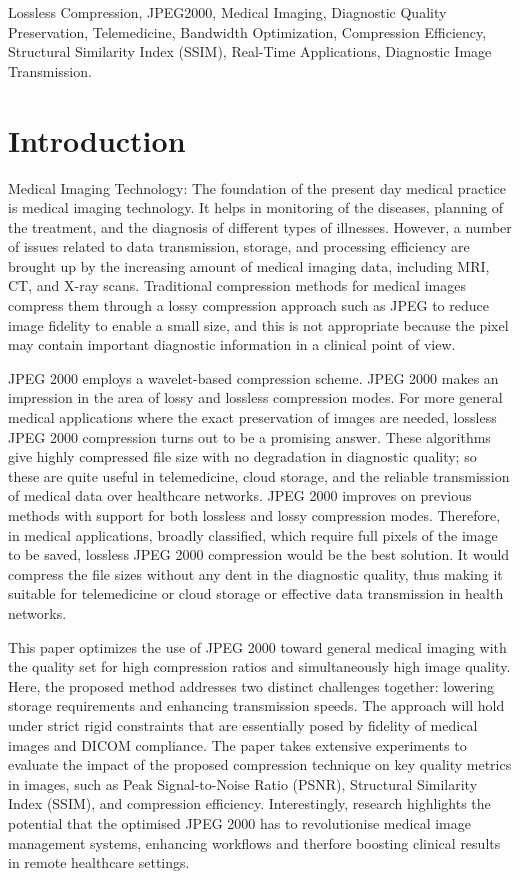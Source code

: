 \documentclass[conference,letterpaper]{IEEEtran}
\begin{document}
\begin{IEEEkeywords}
Lossless Compression, JPEG2000, Medical Imaging, Diagnostic Quality Preservation, Telemedicine, Bandwidth Optimization, Compression Efficiency, Structural Similarity Index (SSIM), Real-Time Applications, Diagnostic Image Transmission.
\end{IEEEkeywords}

\section{Introduction}
Medical Imaging Technology: The foundation of the present day medical practice is medical imaging technology.  It helps in monitoring of the diseases, planning of the treatment, and the diagnosis of different types of illnesses. However, a number of issues related to data transmission, storage, and processing efficiency are brought up by the increasing amount of medical imaging data, including MRI, CT, and X-ray scans. Traditional compression methods for medical images compress them through a lossy compression approach such as JPEG to reduce image fidelity to enable a small size, and this is not appropriate because the pixel may contain important diagnostic information in a clinical point of view.

JPEG 2000 employs a wavelet-based compression scheme. JPEG 2000 makes an impression in the area of lossy and lossless compression modes. For more general medical applications where the exact preservation of images are needed, lossless JPEG 2000 compression turns out to be a promising answer. These algorithms give highly compressed file size with no degradation in diagnostic quality; so these are quite useful in telemedicine, cloud storage, and the reliable transmission of medical data over healthcare networks. JPEG 2000 improves on previous methods with support for both lossless and lossy compression modes. Therefore, in medical applications, broadly classified, which require full pixels of the image to be saved, lossless JPEG 2000 compression would be the best solution. It would compress the file sizes without any dent in the diagnostic quality, thus making it suitable for telemedicine or cloud storage or effective data transmission in health networks.

This paper optimizes the use of JPEG 2000 toward general medical imaging with the quality set for high compression ratios and simultaneously high image quality. Here, the proposed method addresses two distinct challenges together: lowering storage requirements and enhancing transmission speeds. The approach will hold under strict rigid constraints that are essentially posed by fidelity of medical images and DICOM compliance. The paper takes extensive experiments to evaluate the impact of the proposed compression technique on key quality metrics in images, such as Peak Signal-to-Noise Ratio (PSNR), Structural Similarity Index (SSIM), and compression efficiency. Interestingly, research highlights the potential that the optimised JPEG 2000 has to revolutionise medical image management systems, enhancing workflows and therfore boosting clinical results in remote healthcare settings.
\end{document}
